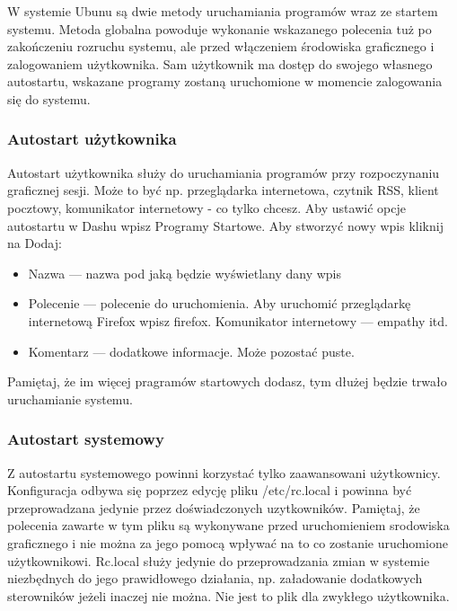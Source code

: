 W systemie Ubunu są dwie metody uruchamiania programów wraz ze startem systemu. Metoda globalna powoduje wykonanie wskazanego polecenia tuż po zakończeniu rozruchu systemu, ale przed włączeniem środowiska graficznego i zalogowaniem użytkownika. Sam użytkownik ma dostęp do swojego własnego autostartu, wskazane programy zostaną uruchomione w momencie zalogowania się do systemu.

\subsubsection{Autostart użytkownika}
Autostart użytkownika służy do uruchamiania programów przy rozpoczynaniu graficznej sesji. Może to być np. przeglądarka internetowa, czytnik RSS, klient pocztowy, komunikator internetowy - co tylko chcesz. Aby ustawić opcje autostartu w Dashu wpisz \textcolor{ubuntu_orange}{Programy Startowe}. Aby stworzyć nowy wpis kliknij na \textcolor{ubuntu_orange}{Dodaj}:
\begin{itemize}
\item \textcolor{ubuntu_orange}{Nazwa} --- nazwa pod jaką będzie wyświetlany dany wpis
\item \textcolor{ubuntu_orange}{Polecenie} --- polecenie do uruchomienia. Aby uruchomić przeglądarkę internetową Firefox wpisz \textcolor{ubuntu_orange}{firefox}. Komunikator internetowy --- \textcolor{ubuntu_orange}{empathy} itd.
\item \textcolor{ubuntu_orange}{Komentarz} --- dodatkowe informacje. Może pozostać puste.
\end{itemize}

Pamiętaj, że im więcej pragramów startowych dodasz, tym dłużej będzie trwało uruchamianie systemu.

\subsubsection{Autostart systemowy}
Z autostartu systemowego powinni korzystać tylko zaawansowani użytkownicy. Konfiguracja odbywa się poprzez edycję pliku \textcolor{ubuntu_orange}{/etc/rc.local} i powinna być przeprowadzana jedynie przez doświadczonych uzytkowników. Pamiętaj, że polecenia zawarte w tym pliku są wykonywane przed uruchomieniem srodowiska graficznego i nie można za jego pomocą wpływać na to co zostanie uruchomione użytkownikowi. Rc.local służy jedynie do przeprowadzania zmian w systemie niezbędnych do jego prawidłowego działania, np. załadowanie dodatkowych sterowników jeżeli inaczej nie można. Nie jest to plik dla zwykłego użytkownika.